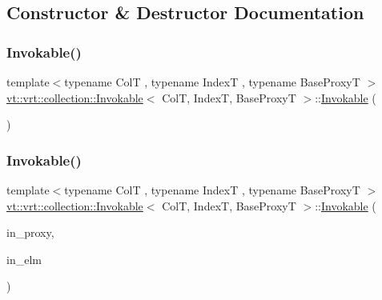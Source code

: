 \subsection{Constructor \& Destructor Documentation}
\mbox{\label{structvt_1_1vrt_1_1collection_1_1_invokable_a6e64beec04b07f74b75ff37d088df3fe}} 
\subsubsection{\texorpdfstring{Invokable()}{Invokable()}\hspace{0.1cm}{\footnotesize\ttfamily [1/2]}}
{\footnotesize\ttfamily template$<$typename ColT , typename IndexT , typename Base\+ProxyT $>$ \\
\hyperlink{structvt_1_1vrt_1_1collection_1_1_invokable}{vt\+::vrt\+::collection\+::\+Invokable}$<$ ColT, IndexT, Base\+ProxyT $>$\+::\hyperlink{structvt_1_1vrt_1_1collection_1_1_invokable}{Invokable} (\begin{DoxyParamCaption}{ }\end{DoxyParamCaption})\hspace{0.3cm}{\ttfamily [default]}}

\mbox{\label{structvt_1_1vrt_1_1collection_1_1_invokable_ac560937c6424cfb4471ba165914f0702}} 
\subsubsection{\texorpdfstring{Invokable()}{Invokable()}\hspace{0.1cm}{\footnotesize\ttfamily [2/2]}}
{\footnotesize\ttfamily template$<$typename ColT , typename IndexT , typename Base\+ProxyT $>$ \\
\hyperlink{structvt_1_1vrt_1_1collection_1_1_invokable}{vt\+::vrt\+::collection\+::\+Invokable}$<$ ColT, IndexT, Base\+ProxyT $>$\+::\hyperlink{structvt_1_1vrt_1_1collection_1_1_invokable}{Invokable} (\begin{DoxyParamCaption}\item[{typename Base\+Proxy\+T\+::\+Proxy\+Type const \&}]{in\+\_\+proxy,  }\item[{typename Base\+Proxy\+T\+::\+Element\+Proxy\+Type const \&}]{in\+\_\+elm }\end{DoxyParamCaption})}



